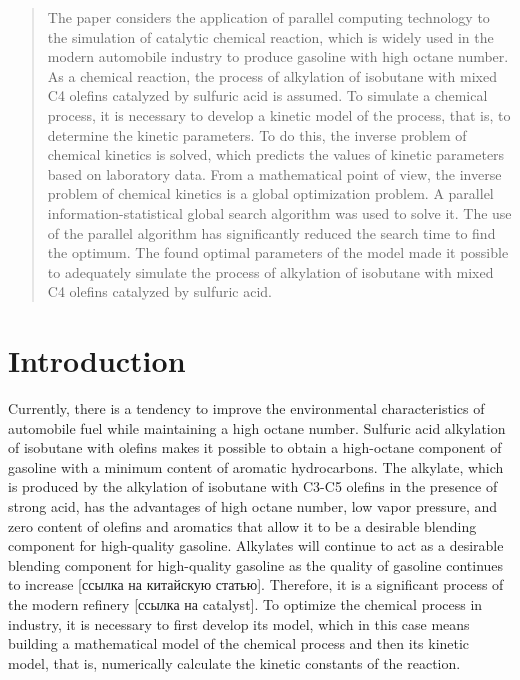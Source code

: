 \documentclass{svproc}
\begin{document}
\begin{abstract}

The paper considers the application of parallel computing technology to the simulation of catalytic chemical reaction, which is widely used in the modern automobile industry to produce gasoline with high octane number. As a chemical reaction, the process of alkylation of isobutane with mixed C4 olefins catalyzed by sulfuric acid is assumed. To simulate a chemical process, it is necessary to develop a kinetic model of the process, that is, to determine the kinetic parameters. To do this, the inverse problem of chemical kinetics is solved, which predicts the values of kinetic parameters based on laboratory data. From a mathematical point of view, the inverse problem of chemical kinetics is a global optimization problem. A parallel information-statistical global search algorithm was used to solve it. The use of the parallel algorithm has significantly reduced the search time to find the optimum. The found optimal parameters of the model made it possible to adequately simulate the process of alkylation of isobutane with mixed C4 olefins catalyzed by sulfuric acid.

\end{abstract}

\section{Introduction}

Currently, there is a tendency to improve the environmental characteristics of automobile fuel while maintaining a high octane number. Sulfuric acid alkylation of isobutane with olefins makes it possible to obtain a high-octane component of gasoline with a minimum content of aromatic hydrocarbons. The alkylate, which is produced by the alkylation of isobutane with C3-C5 olefins in the presence of strong acid, has the advantages of high octane number, low vapor pressure, and zero content of olefins and aromatics that allow it to be a desirable blending component for high-quality gasoline. Alkylates will continue to act as a desirable blending component for high-quality gasoline as the quality of gasoline continues to increase [ссылка на китайскую статью]. Therefore, it is a significant process of the modern refinery [ссылка на catalyst]. To optimize the chemical process in industry, it is necessary to first develop its model, which in this case means building a mathematical model of the chemical process and then its kinetic model, that is, numerically calculate the kinetic constants of the reaction. 
\end{document}
